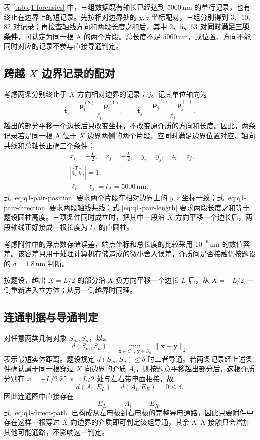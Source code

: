 \documentclass[withoutpreface,bwprint]{cumcmthesis}
\begin{document}
表 \ref{tab:q1-forensics} 中，三组数据既有轴长已经达到 $5000\,\mathrm{nm}$ 的单行记录，也有终止在边界上的短记录。先按相对边界处的 $y,z$ 坐标配对，三组分别得到 $3$、$10$、$82$ 对记录；再检查轴线方向和两段长度之和后，其中 \textbf{$2$、$5$、$63$ 对同时满足三项条件}，可认定为同一根 A 的两个片段。总长度不足 $5000\,\mathrm{nm}$，或位置、方向不能同时对应的记录不参与直接导通判定。

\subsection{跨越 \texorpdfstring{$X$}{X} 边界记录的配对}

考虑两条分别终止于 $X$ 方向相对边界的记录 $i,j$。记其单位轴向为
\[
 \widehat{\boldsymbol t}_i=
 \frac{\boldsymbol p_i^{(2)}-\boldsymbol p_i^{(1)}}{\ell_i},\qquad
 \widehat{\boldsymbol t}_j=
 \frac{\boldsymbol p_j^{(2)}-\boldsymbol p_j^{(1)}}{\ell_j}.
\]
越出的部分平移一个边长后只改变坐标，不改变原介质的方向和长度。因此，两条记录若是同一根 A 位于 $X$ 边界两侧的两个片段，应同时满足边界位置对应、轴向共线和总轴长正确三个条件：
\begin{align}
 &x_i=+\frac L2,\quad x_j=-\frac L2,
 \quad y_i=y_j,\quad z_i=z_j, \label{eq:q1-pair-position}\\
 &\left|\widehat{\boldsymbol t}_i^{\mathsf T}\widehat{\boldsymbol t}_j\right|=1, \label{eq:q1-pair-direction}\\
 &\ell_i+\ell_j=l_A=5000\,\mathrm{nm}. \label{eq:q1-pair-length}
\end{align}
式 \eqref{eq:q1-pair-position} 要求两个片段在相对边界上的 $y,z$ 坐标一致；式 \eqref{eq:q1-pair-direction} 要求两段轴线共线；式 \eqref{eq:q1-pair-length} 要求两段长度之和等于题设圆柱高度。三项条件同时成立时，把其中一段沿 $X$ 方向平移一个边长后，两段轴线正好接成一根长度为 $l_A$ 的直圆柱。

考虑附件中的浮点数存储误差，端点坐标和总长度的比较采用 $10^{-6}\,\mathrm{nm}$ 的数值容差。该容差只用于处理计算机存储造成的微小舍入误差，介质间是否接触仍按题设的 $\delta=1.8\,\mathrm{nm}$ 判断。

按题设，越出 $X=L/2$ 的部分沿 $X$ 负方向平移一个边长 $L$ 后，从 $X=-L/2$ 一侧重新进入立方体；从另一侧越界时同理。

\subsection{连通判据与导通判定}

对任意两类几何对象 $S_m,S_n$，以z
\[
 d(S_m,S_n)=\min_{\boldsymbol x\in S_m,\,\boldsymbol y\in S_n}
 \|\boldsymbol x-\boldsymbol y\|_2
\]
表示最短实体距离。题设规定 $d(S_m,S_n)\leq\delta$ 时二者导通。若两条记录经上述条件确认属于同一根穿过 $X$ 向边界的介质 $A_i$，则按题意平移越出部分后，这根介质分别在 $x=-L/2$ 和 $x=L/2$ 处与左右带电面相接，故
\[
 d(A_i,E_L)=d(A_i,E_R)=0\leq\delta.
\]
因此连通图中直接存在
\begin{equation}
 E_L\;--\;A_i\;--\;E_R,
 \label{eq:q1-direct-path}
\end{equation}
式 \eqref{eq:q1-direct-path} 已构成从左电极到右电极的完整导电通路，因此只要附件中存在这样一根穿过 $X$ 向边界的介质即可判定该组导通，其余 A--A 接触只会增加其他可能通路，不影响这一判定。
\end{document}
